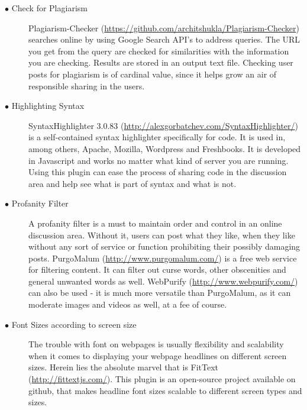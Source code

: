 \documentclass[hidelinks, 12pt]{article}
\begin{document}
\begin{description}
\item[$\bullet$ Check for Plagiarism]
Plagiarism-Checker (\url{https://github.com/architshukla/Plagiarism-Checker}) searches online by using Google Search API's to address queries. The URL you get from the query are checked for similarities with the information you are checking. Results are stored in an output text file. Checking user posts for plagiarism is of cardinal value, since it helps grow an air of responsible sharing in the users.
\item[$\bullet$ Highlighting Syntax]
SyntaxHighlighter 3.0.83 (\url{http://alexgorbatchev.com/SyntaxHighlighter/}) is a self-contained syntax highlighter specifically for code. It is used in, among others, Apache, Mozilla, Wordpress and Freshbooks. It is developed in Javascript and works no matter what kind of server you are running. Using this plugin can ease the process of sharing code in the discussion area and help see what is part of syntax and what is not.
\item[$\bullet$ Profanity Filter]
A profanity filter is a must to maintain order and control in an online discussion area. Without it, users can post what they like, when they like without any sort of service or function prohibiting their possibly damaging posts. PurgoMalum (\url{http://www.purgomalum.com/}) is a free web service for filtering content. It can filter out curse words, other obscenities and general unwanted words as well. WebPurify (\url{http://www.webpurify.com/}) can also be used - it is much more versatile than PurgoMalum, as it can moderate images and videos as well, at a fee of course.
\item[$\bullet$ Font Sizes according to screen size]
The trouble with font on webpages is usually flexibility and scalability when it comes to displaying your webpage headlines on different screen sizes. Herein lies the absolute marvel that is FitText (\url{http://fittextjs.com/}). This plugin is an open-source project available on github, that makes headline font sizes scalable to different screen types and sizes.
\end{description}
\end{document}
